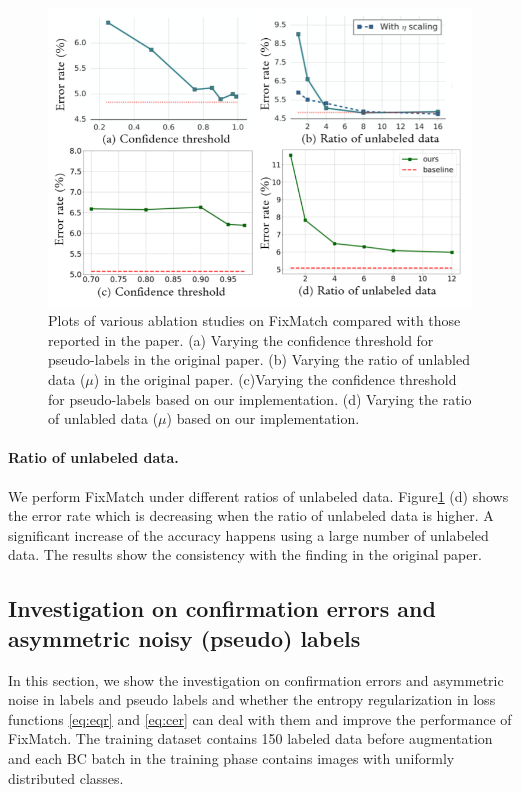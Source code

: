 \begin{figure}[h]
\centering
\includegraphics[width=14cm]{../openreview/fig/FixMatch.png}
\caption{Plots of various ablation studies on FixMatch compared with those reported in the paper. (a) Varying the confidence threshold for pseudo-labels in the original paper. (b) Varying the ratio of unlabled data ($\mu$) in the original paper. (c)Varying the confidence threshold for pseudo-labels based on our implementation. (d) Varying the ratio of unlabled data ($\mu$) based on our implementation.
}\label{fig:abastudy}
\end{figure}



\paragraph{Ratio of unlabeled data.}

We perform FixMatch under different ratios of unlabeled data. Figure\ref{fig:abastudy} (d) shows the error rate which is decreasing when the ratio of unlabeled data is higher. A significant increase of the accuracy happens using a large number of unlabeled data. The results show the consistency with the finding in the original paper.



\subsection{Investigation on confirmation errors and asymmetric noisy (pseudo) labels} \label{sec:exp_noise}
In this section, we show the investigation on confirmation errors and asymmetric noise in labels and pseudo labels and whether the entropy regularization in loss functions \eqref{eq:eqr} and \eqref{eq:cer} can deal with them and improve the performance of FixMatch. The training dataset contains 150 labeled data before augmentation and each BC batch in the training phase contains images with uniformly distributed classes.

